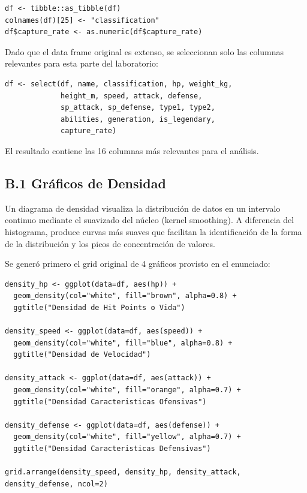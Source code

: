 \documentclass[11pt,a4paper]{article}
\begin{document}
\begin{lstlisting}[style=Rstyle]
df <- tibble::as_tibble(df)
colnames(df)[25] <- "classification"
df$capture_rate <- as.numeric(df$capture_rate)
\end{lstlisting}

Dado que el data frame original es extenso, se seleccionan solo las columnas relevantes para
esta parte del laboratorio:

\begin{lstlisting}[style=Rstyle]
df <- select(df, name, classification, hp, weight_kg,
             height_m, speed, attack, defense,
             sp_attack, sp_defense, type1, type2,
             abilities, generation, is_legendary,
             capture_rate)
\end{lstlisting}

El resultado contiene las 16 columnas más relevantes para el análisis.

\subsection{B.1 Gráficos de Densidad}

Un diagrama de densidad visualiza la distribución de datos en un intervalo continuo mediante el
suavizado del núcleo (kernel smoothing). A diferencia del histograma, produce curvas más suaves
que facilitan la identificación de la forma de la distribución y los picos de concentración de valores.

Se generó primero el grid original de 4 gráficos provisto en el enunciado:

\begin{lstlisting}[style=Rstyle]
density_hp <- ggplot(data=df, aes(hp)) +
  geom_density(col="white", fill="brown", alpha=0.8) +
  ggtitle("Densidad de Hit Points o Vida")

density_speed <- ggplot(data=df, aes(speed)) +
  geom_density(col="white", fill="blue", alpha=0.8) +
  ggtitle("Densidad de Velocidad")

density_attack <- ggplot(data=df, aes(attack)) +
  geom_density(col="white", fill="orange", alpha=0.7) +
  ggtitle("Densidad Caracteristicas Ofensivas")

density_defense <- ggplot(data=df, aes(defense)) +
  geom_density(col="white", fill="yellow", alpha=0.7) +
  ggtitle("Densidad Caracteristicas Defensivas")

grid.arrange(density_speed, density_hp, density_attack, density_defense, ncol=2)
\end{lstlisting}
\end{document}
